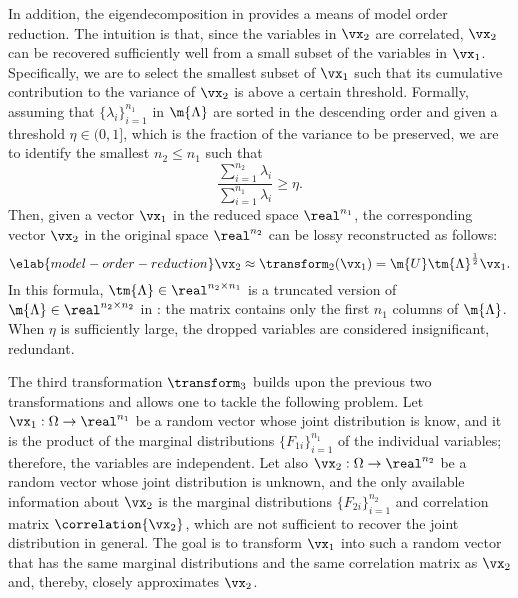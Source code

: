 In addition, the eigendecomposition in  provides a
means of model order reduction. The intuition is that, since the variables in
$\vx_2$ are correlated, $\vx_2$ can be recovered sufficiently well from a small
subset of the variables in $\vx_1$. Specifically, we are to select the smallest
subset of $\vx_1$ such that its cumulative contribution to the variance of
$\vx_2$ is above a certain threshold. Formally, assuming that $\{ \lambda_i
\}_{i = 1}^{n_1}$ in $\m{\Lambda}$ are sorted in the descending order and given
a threshold $\eta \in (0, 1]$, which is the fraction of the variance to be
preserved, we are to identify the smallest $n_2 \leq n_1$ such that
\[
  \frac{\sum_{i = 1}^{n_2} \lambda_i}{\sum_{i = 1}^{n_1} \lambda_i} \geq \eta.
\]
Then, given a vector $\vx_1$ in the reduced space $\real^{n_1}$, the
corresponding vector $\vx_2$ in the original space $\real^{n_2}$ can be lossy
reconstructed as follows:
\begin{equation} \elab{model-order-reduction}
  \vx_2 \approx \transform_2(\vx_1) = \m{U} \tm{\Lambda}^\frac{1}{2} \vx_1.
\end{equation}
In this formula, $\tm{\Lambda} \in \real^{n_2 \times n_1}$ is a truncated
version of $\m{\Lambda} \in \real^{n_2 \times n_2}$ in
: the matrix contains only the first $n_1$ columns of
$\m{\Lambda}$. When $\eta$ is sufficiently large, the dropped variables are
considered insignificant, redundant.

The third transformation $\transform_3$ builds upon the previous two
transformations and allows one to tackle the following problem. Let $\vx_1:
\Omega \to \real^{n_1}$ be a random vector whose joint distribution is know, and
it is the product of the marginal distributions $\{ F_{1i} \}_{i = 1}^{n_1}$ of
the individual variables; therefore, the variables are independent. Let also
$\vx_2: \Omega \to \real^{n_2}$ be a random vector whose joint distribution is
unknown, and the only available information about $\vx_2$ is the marginal
distributions $\{ F_{2i} \}_{i = 1}^{n_2}$ and correlation matrix
$\correlation{\vx_2}$, which are not sufficient to recover the joint
distribution in general. The goal is to transform $\vx_1$ into such a random
vector that has the same marginal distributions and the same correlation matrix
as $\vx_2$ and, thereby, closely approximates $\vx_2$.

